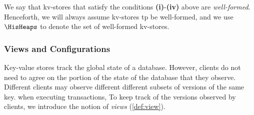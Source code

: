 %
We say that kv-stores that satisfy the conditions \textbf{(i)}-\textbf{(iv)} above are 
\emph{well-formed}.
Henceforth, we will always assume kv-stores tp be well-formed, and we use $\HisHeaps$ to denote 
the set of well-formed kv-stores.

\subsubsection{Views and Configurations}

Key-value stores track the global state of a database. 
However, clients do not need to agree on the portion of 
the state of the database that they observe. Different clients 
may observe different different subsets of versions of the same key.
when executing transactions,
To keep track of the versions observed by clients,
we introduce the notion of \emph{views} (\cref{def:view}). 

